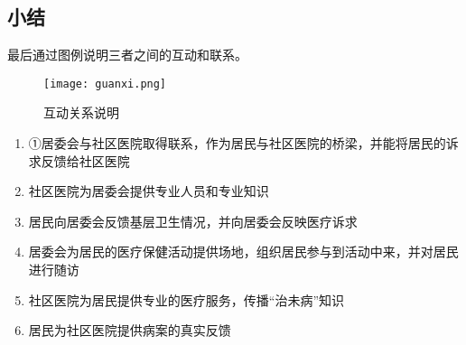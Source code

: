 \subsection{小结}
最后通过图例说明三者之间的互动和联系。

\begin{figure}[h]
    \texttt{[image: guanxi.png]}
    \centering
    \caption{互动关系说明}
\end{figure}
\begin{spacing}{0.9}
\begin{enumerate}
    \item ①居委会与社区医院取得联系，作为居民与社区医院的桥梁，并能将居民的诉求反馈给社区医院
    \item 社区医院为居委会提供专业人员和专业知识
    \item 居民向居委会反馈基层卫生情况，并向居委会反映医疗诉求
    \item 居委会为居民的医疗保健活动提供场地，组织居民参与到活动中来，并对居民进行随访
    \item 社区医院为居民提供专业的医疗服务，传播“治未病”知识
    \item 居民为社区医院提供病案的真实反馈
\end{enumerate}
\end{spacing}